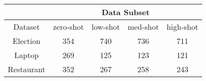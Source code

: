 \begin{tabular}{|c|c|c|c|c|}
\hline
        & \multicolumn{4}{c|}{Data Subset} \\
\hline
Dataset &   zero-shot &  low-shot &  med-shot &  high-shot \\
\hline
Election   &        354 &       740 &       736 &         711 \\
\hline
Laptop     &        269 &       125 &       123 &         121 \\
\hline
Restaurant &        352 &       267 &       258 &         243 \\ 
\hline
\end{tabular}